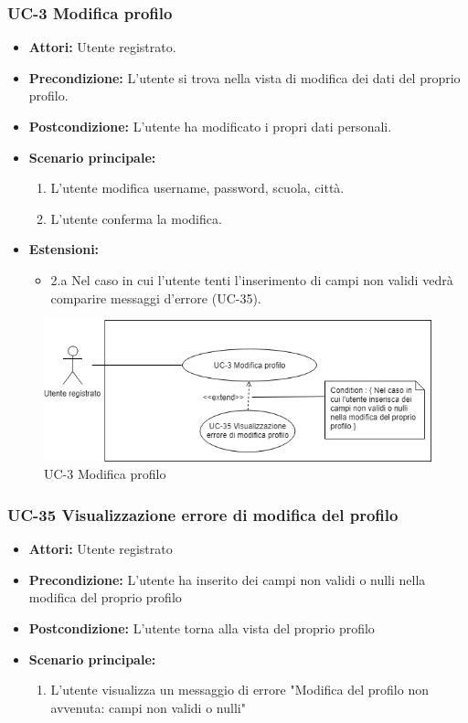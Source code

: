 \subsubsection{UC-3 Modifica profilo}
		\begin{itemize}
			\item \textbf{Attori:} Utente registrato.
			\item \textbf{Precondizione:} L'utente si trova nella vista di modifica dei dati del proprio profilo.
			\item \textbf{Postcondizione:} L'utente ha modificato i propri dati personali.
			\item \textbf{Scenario principale:}
				\begin{enumerate}
					\item L'utente modifica username, password, scuola, città.
					\item L'utente conferma la modifica. 
				\end{enumerate}
				\item \textbf{Estensioni:}
				\begin{itemize}
					\item 2.a Nel caso in cui l'utente tenti l'inserimento di campi non validi vedrà comparire messaggi d'errore (UC-35).
				\end{itemize}
		\end{itemize}
		\begin{figure}[htbp]
			\centering
			\includegraphics[scale=0.7]{images/UC-3.png}
			\caption{UC-3 Modifica profilo}
		\end{figure}
	
\subsubsection{UC-35 Visualizzazione errore di modifica del profilo}	
	\begin{itemize}
		\item \textbf{Attori:} Utente registrato
		\item \textbf{Precondizione:} L'utente ha inserito dei campi non validi o nulli nella modifica del proprio profilo
		\item \textbf{Postcondizione:} L'utente torna alla vista del proprio profilo
		\item \textbf{Scenario principale:}
		\begin{enumerate}
			\item L'utente visualizza un messaggio di errore "Modifica del profilo non avvenuta: campi non validi o nulli"
		\end{enumerate}
	\end{itemize}

